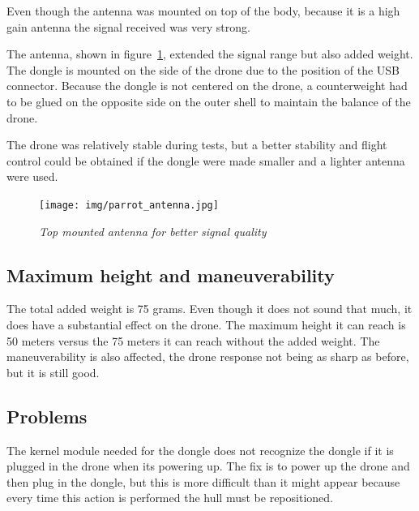 Even though the antenna was mounted on top of the body, because it is a high gain antenna the signal received was very strong. 

The antenna, shown in figure~\ref{fig:antenna}, extended the signal range but also added weight. The dongle is mounted on the side of the drone due to the position of the USB connector. Because the dongle is not centered on the drone, a counterweight had to be glued on the opposite side on the outer shell to maintain the balance of the drone. 

The drone was relatively stable during tests, but a better stability and flight control could be obtained if the dongle were made smaller and a lighter antenna were used.


\begin{figure}[ht]
\begin{center}
\texttt{[image: img/parrot\_antenna.jpg]}
\end{center}
\caption{\small \itshape{Top mounted antenna for better signal quality}}
  \label{fig:antenna}
\end{figure}



\subsection{Maximum height and maneuverability}

The total added weight is 75 grams. Even though it does not sound that much, it does have a substantial effect on the drone. The maximum height it can reach is 50 meters versus the 75 meters it can reach without the added weight. The maneuverability is also affected, the drone response not being as sharp as before, but it is still good.

\subsection{Problems}

The kernel module needed for the dongle does not recognize the dongle if it is plugged in the drone when its powering up. The fix is to power up the drone and then plug in the dongle, but this is more difficult than it might appear because every time this action is performed the hull must be repositioned.

\clearpage
